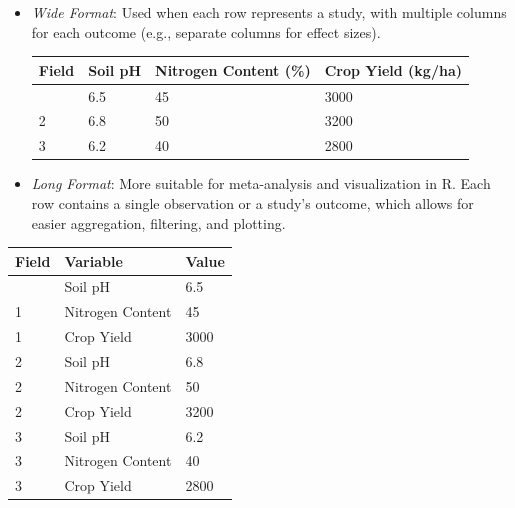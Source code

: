 \documentclass[
]{book}
\begin{document}
\begin{itemize}
\item
  \emph{Wide Format}: Used when each row represents a study, with multiple columns for each outcome (e.g., separate columns for effect sizes).

  \begin{longtable}[]{@{}llll@{}}
  \toprule\noalign{}
  Field & Soil pH & Nitrogen Content (\%) & Crop Yield (kg/ha) \\
  \midrule\noalign{}
  \endhead
  \bottomrule\noalign{}
  \endlastfoot
  1 & 6.5 & 45 & 3000 \\
  2 & 6.8 & 50 & 3200 \\
  3 & 6.2 & 40 & 2800 \\
  \end{longtable}
\item
  \emph{Long Format}: More suitable for meta-analysis and visualization in R.
  Each row contains a single observation or a study's outcome, which allows for easier aggregation, filtering, and plotting.
\end{itemize}

\begin{longtable}[]{@{}lll@{}}
\toprule\noalign{}
Field & Variable & Value \\
\midrule\noalign{}
\endhead
\bottomrule\noalign{}
\endlastfoot
1 & Soil pH & 6.5 \\
1 & Nitrogen Content & 45 \\
1 & Crop Yield & 3000 \\
2 & Soil pH & 6.8 \\
2 & Nitrogen Content & 50 \\
2 & Crop Yield & 3200 \\
3 & Soil pH & 6.2 \\
3 & Nitrogen Content & 40 \\
3 & Crop Yield & 2800 \\
\end{longtable}
\end{document}

